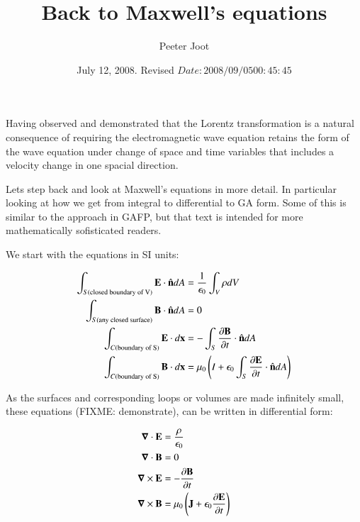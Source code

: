 \documentclass{article}
\title{ Back to Maxwell's equations }
\author{Peeter Joot}
\date{ July 12, 2008. Revised $Date: 2008/09/05 00:45:45 $}
\newcommand{\spacegrad}[0]{\boldsymbol{\nabla}}
\begin{document}
             


\maketitle{}

\section{ }

Having observed and demonstrated that the Lorentz transformation is a natural consequence of requiring the electromagnetic wave equation retains the
form of the wave equation under change of space and time variables that includes a velocity change in one spacial direction.

Lets step back and look at Maxwell's equations in more detail.  In particular looking at how we get from integral to differential
to GA form.  Some of this is similar to the approach in GAFP, but that text is intended for more mathematically sofisticated readers.

We start with the equations in SI units:

\begin{align*}
\int_{S(\text{closed boundary of V})} \mathbf{E} \cdot \hat{\mathbf{n}} dA &= \frac{1}{\epsilon_0} \int_V \rho dV \\
\int_{S(\text{any closed surface})} \mathbf{B} \cdot \hat{\mathbf{n}} dA &= 0 \\
\int_{C(\text{boundary of S})} \mathbf{E} \cdot d\mathbf{x} &= - \int_{S} \frac{\partial \mathbf{B}}{\partial t} \cdot \hat{\mathbf{n}} dA \\
\int_{C(\text{boundary of S})} \mathbf{B} \cdot d\mathbf{x} &= \mu_0\left(I + \epsilon_0\int_{S} \frac{\partial \mathbf{E}}{\partial t} \cdot \hat{\mathbf{n}} dA\right) \\
\end{align*}

As the surfaces and corresponding loops or volumes are made infinitely small, these equations (FIXME: demonstrate), can be written in differential form:

\begin{align*}
\spacegrad \cdot \BE &= \frac{\rho}{\epsilon_0} \\
\spacegrad \cdot \BB &= 0 \\
\spacegrad \cross \BE &= - \frac{\partial \BB}{\partial t} \\
\spacegrad \cross \BB &= \mu_0\left(\BJ + \epsilon_0 \frac{\partial \BE}{\partial t}\right) \\
\end{align*}
\end{document}
